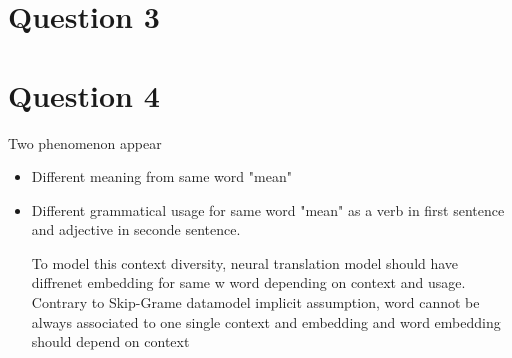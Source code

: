 \documentclass[a4paper]{article}
\begin{document}
\section{Question 3}

\section{Question 4}
Two phenomenon appear
\begin{itemize}
\item Different meaning from same word "mean"
\item Different grammatical usage for same word "mean" as a verb in first sentence and adjective in seconde sentence.

To model this context diversity, neural translation model should have diffrenet embedding for same w word depending on context and usage.  Contrary to \cite{quocLe2014doc2vec} Skip-Grame datamodel implicit assumption, word cannot be always associated to one single context and embedding and word embedding should depend on context
\end{itemize}




\end{document}
